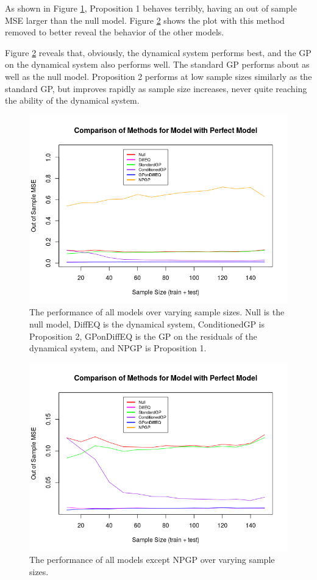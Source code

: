 \documentclass{article}
\begin{document}
	As shown in Figure \ref{fig3}, Proposition 1 behaves terribly, having an out of sample MSE larger than the null model. Figure \ref{fig4} shows the plot with this method removed to better reveal the behavior of the other models.
	
	Figure \ref{fig4} reveals that, obviously, the dynamical system performs best, and the GP on the dynamical system also performs well. The standard GP performs about as well as the null model. Proposition 2 performs at low sample sizes similarly as the standard GP, but improves rapidly as sample size increases, never quite reaching the ability of the dynamical system.
	
	\begin{figure}[H]
		\includegraphics[scale=0.7]{PrezImage4.png}
		\caption{The performance of all models over varying sample sizes. Null is the null model, DiffEQ is the dynamical system, ConditionedGP is Proposition 2, GPonDiffEQ is the GP on the residuals of the dynamical system, and NPGP is Proposition 1.}
		\label{fig3}
	\end{figure}
	
	\begin{figure}[H]
		\includegraphics[scale=0.7]{PrezImage5.png}
		\caption{The performance of all models except NPGP over varying sample sizes.}
		\label{fig4}
	\end{figure}
	
\end{document}
